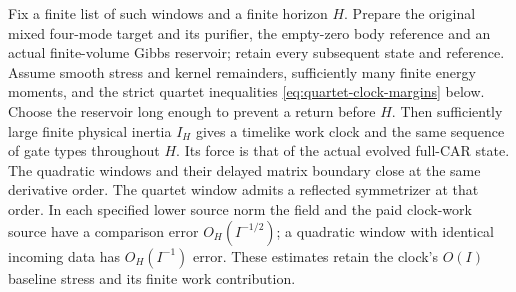 \begin{proposition}
\label{prop:retained-window-clock}
Fix a finite list of such windows and a finite horizon $H$. Prepare
the original mixed four-mode target and its purifier, the empty-zero
body reference and an actual finite-volume Gibbs reservoir; retain
every subsequent state and reference. Assume smooth stress and kernel
remainders, sufficiently many finite energy moments, and the strict
quartet inequalities \eqref{eq:quartet-clock-margins} below.
Choose the reservoir long enough to prevent a return before $H$.
Then sufficiently large finite physical inertia $I_H$ gives a
timelike work clock and the same sequence of gate types throughout
$H$. Its force is that of the actual evolved full-CAR state.
The quadratic windows and their delayed matrix boundary close at the
same derivative order. The quartet window admits a reflected
symmetrizer at that order. In each specified lower source norm the
field and the paid clock-work source have a comparison error
$O_H(I^{-1/2})$; a quadratic window with identical incoming data has
$O_H(I^{-1})$ error. These estimates retain the clock's $O(I)$
baseline stress and its finite work contribution.
\end{proposition}

